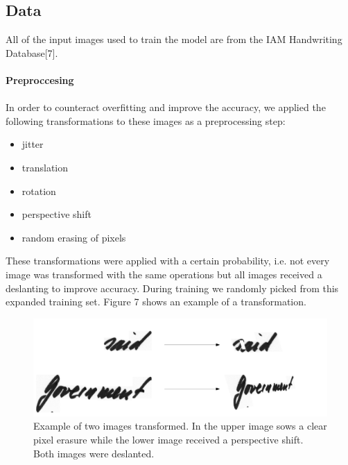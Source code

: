 \documentclass{article}
\begin{document}
\subsection{Data}
All of the input images used to train the model are from the IAM Handwriting Database[7].\\\\
\textbf{Preproccesing}\\\\
In order to counteract overfitting and improve the accuracy, we applied the following transformations to these images as a preprocessing step: 
\begin{itemize}
\item jitter
\item translation
\item rotation
\item perspective shift
\item random erasing of pixels
\end{itemize}
These transformations were applied with a certain probability, i.e. not every image was transformed with the same operations but all images received a deslanting to improve accuracy. During training we randomly picked from this expanded training set. Figure 7 shows an example of a transformation.
\begin{figure}[H]
\begin{center}
\includegraphics[scale=0.3]{rsz_transform}
\end{center}
\caption{Example of two images transformed. In the upper image sows a clear pixel erasure while the lower image received a perspective shift. Both images were deslanted.}
\end{figure}
\end{document}
